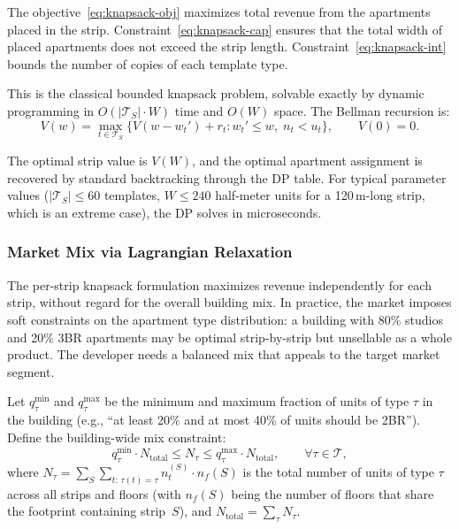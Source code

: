 \documentclass[11pt,a4paper]{article}
\newcommand{\calT}{\mathcal{T}}
\begin{document}
The objective~\eqref{eq:knapsack-obj} maximizes total revenue from the
apartments placed in the strip. Constraint~\eqref{eq:knapsack-cap}
ensures that the total width of placed apartments does not exceed the
strip length. Constraint~\eqref{eq:knapsack-int} bounds the number of
copies of each template type.

This is the classical bounded knapsack problem, solvable exactly by
dynamic programming in $O(|\calT_S| \cdot W)$ time and $O(W)$ space.
The Bellman recursion is:
\begin{equation}\label{eq:dp}
    V(w) = \max_{t \in \calT_S}\bigl\{V(w - w_t') + r_t : w_t' \leq w,\; n_t < u_t\bigr\}, \qquad V(0) = 0.
\end{equation}

The optimal strip value is $V(W)$, and the optimal apartment assignment
is recovered by standard backtracking through the DP table. For typical
parameter values ($|\calT_S| \leq 60$ templates, $W \leq 240$ half-meter
units for a 120\,m-long strip, which is an extreme case), the DP solves
in microseconds.

\subsubsection{Market Mix via Lagrangian Relaxation}

The per-strip knapsack formulation maximizes revenue independently for
each strip, without regard for the overall building mix. In practice,
the market imposes soft constraints on the apartment type distribution:
a building with 80\% studios and 20\% 3BR apartments may be optimal
strip-by-strip but unsellable as a whole product. The developer needs a
balanced mix that appeals to the target market segment.

Let $q_\tau^{\min}$ and $q_\tau^{\max}$ be the minimum and maximum
fraction of units of type $\tau$ in the building (e.g., ``at least
20\% and at most 40\% of units should be 2BR''). Define the
building-wide mix constraint:
\begin{equation}\label{eq:mix}
    q_\tau^{\min} \cdot N_{\text{total}} \leq N_\tau \leq q_\tau^{\max} \cdot N_{\text{total}}, \qquad \forall \tau \in \calT,
\end{equation}
where $N_\tau = \sum_{S} \sum_{t:\, \tau(t)=\tau} n_t^{(S)} \cdot n_f(S)$
is the total number of units of type $\tau$ across all strips and floors
(with $n_f(S)$ being the number of floors that share the footprint
containing strip~$S$), and
$N_{\text{total}} = \sum_\tau N_\tau$.
\end{document}

